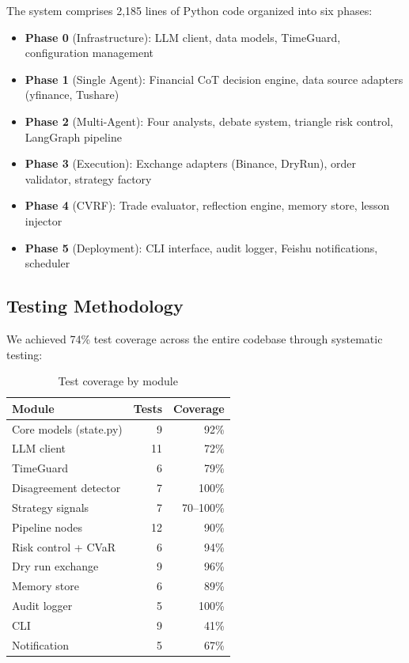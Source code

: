 \documentclass[twocolumn]{article}
\begin{document}
The system comprises 2,185 lines of Python code organized into six phases:
\begin{itemize}
    \item \textbf{Phase 0} (Infrastructure): LLM client, data models, TimeGuard, configuration management
    \item \textbf{Phase 1} (Single Agent): Financial CoT decision engine, data source adapters (yfinance, Tushare)
    \item \textbf{Phase 2} (Multi-Agent): Four analysts, debate system, triangle risk control, LangGraph pipeline
    \item \textbf{Phase 3} (Execution): Exchange adapters (Binance, DryRun), order validator, strategy factory
    \item \textbf{Phase 4} (CVRF): Trade evaluator, reflection engine, memory store, lesson injector
    \item \textbf{Phase 5} (Deployment): CLI interface, audit logger, Feishu notifications, scheduler
\end{itemize}

\subsection{Testing Methodology}

We achieved 74\% test coverage across the entire codebase through systematic testing:

\begin{table}[h]
\centering
\caption{Test coverage by module}
\label{tab:coverage}
\begin{tabular}{lrr}
\toprule
\textbf{Module} & \textbf{Tests} & \textbf{Coverage} \\
\midrule
Core models (state.py) & 9 & 92\% \\
LLM client & 11 & 72\% \\
TimeGuard & 6 & 79\% \\
Disagreement detector & 7 & 100\% \\
Strategy signals & 7 & 70--100\% \\
Pipeline nodes & 12 & 90\% \\
Risk control + CVaR & 6 & 94\% \\
Dry run exchange & 9 & 96\% \\
Memory store & 6 & 89\% \\
Audit logger & 5 & 100\% \\
CLI & 9 & 41\% \\
Notification & 5 & 67\% \\
\bottomrule
\end{tabular}
\end{table}
\end{document}
